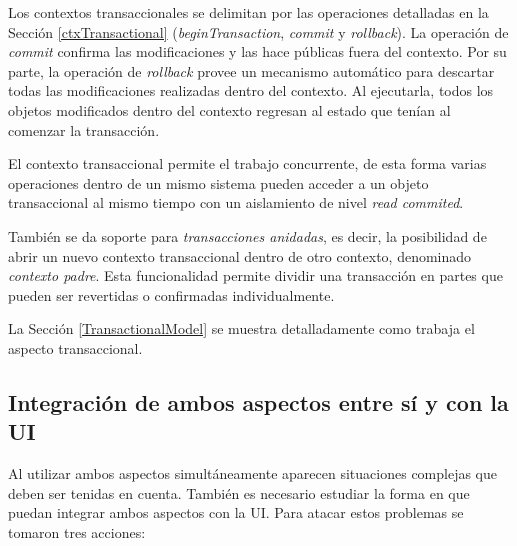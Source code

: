 		Los contextos transaccionales se delimitan por las
		operaciones detalladas en la Sección \ref{ctxTransactional}
		(\emph{beginTransaction}, \emph{commit} y \emph{rollback}).
		La operación de \emph{commit} confirma las modificaciones y las hace públicas
		fuera del contexto.
		Por su parte, la operación de \emph{rollback} provee un
		mecanismo automático para descartar todas las modificaciones realizadas
		dentro del contexto.
		Al ejecutarla, todos los objetos modificados dentro del contexto regresan al
		estado que tenían al comenzar la transacción.
		 
		El contexto transaccional permite el trabajo concurrente, de esta forma
		varias operaciones dentro de un mismo sistema pueden acceder a un objeto transaccional al mismo
		tiempo con un aislamiento de nivel \emph{read commited}.
				 
		También se da soporte para \emph{transacciones anidadas}, es decir, la
		posibilidad de abrir un nuevo contexto transaccional dentro de otro contexto,
		denominado \emph{contexto padre}.
		Esta funcionalidad permite dividir una transacción en partes que pueden ser
		revertidas o confirmadas individualmente.
		
		La Sección \ref{TransactionalModel} se muestra detalladamente como trabaja el
		aspecto transaccional.
		
		
		
	\subsection{Integración de ambos aspectos entre sí y con la UI}
	\label{sec:Union}
		Al utilizar ambos aspectos simultáneamente aparecen situaciones complejas que
		deben ser tenidas en cuenta. También es necesario estudiar la forma en que
		puedan integrar ambos aspectos con la UI.
		Para atacar estos problemas se tomaron tres acciones:
		
